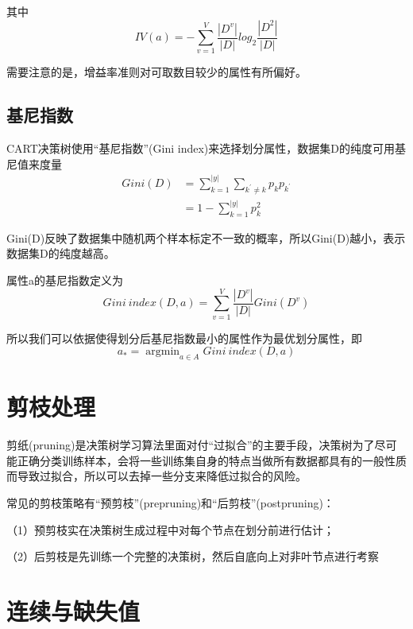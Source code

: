 \documentclass[UTF8]{article}
\begin{document}
其中
\begin{equation}
  IV(a) = -\sum_{v=1}^{V}\frac{|D^v|}{|D|} log_2 \frac{|D^2|}{|D|}
\end{equation}

需要注意的是，增益率准则对可取数目较少的属性有所偏好。
\subsection{基尼指数}
CART决策树使用“基尼指数”(Gini index)来选择划分属性，数据集D的纯度可用基尼值来度量
\begin{equation}
  \begin{split}
  Gini(D) &= \sum_{k=1}^{|y|} \sum_{k^{\prime} \neq k} p_k p_{k^{\prime}}\\
  &= 1 - \sum_{k=1}^{|y|} p_{k}^{2}
  \end{split}
\end{equation}

Gini(D)反映了数据集中随机两个样本标定不一致的概率，所以Gini(D)越小，表示数据集D的纯度越高。

属性a的基尼指数定义为
\begin{equation}
  Gini\ index(D, a) = \sum_{v=1}^V \frac{|D^v|}{|D|} Gini(D^v)
\end{equation}

所以我们可以依据使得划分后基尼指数最小的属性作为最优划分属性，即
\begin{equation}
  a_{*} = \mathop{\arg\min}_{a \in A} Gini\ index(D, a)
\end{equation}

\section{剪枝处理}

剪纸(pruning)是决策树学习算法里面对付“过拟合”的主要手段，决策树为了尽可能正确分类训练样本，会将一些训练集自身的特点当做所有数据都具有的一般性质而导致过拟合，所以可以去掉一些分支来降低过拟合的风险。

常见的剪枝策略有“预剪枝”(prepruning)和“后剪枝”(postpruning)：

（1）预剪枝实在决策树生成过程中对每个节点在划分前进行估计；

（2）后剪枝是先训练一个完整的决策树，然后自底向上对非叶节点进行考察

\section{连续与缺失值}
\end{document}
